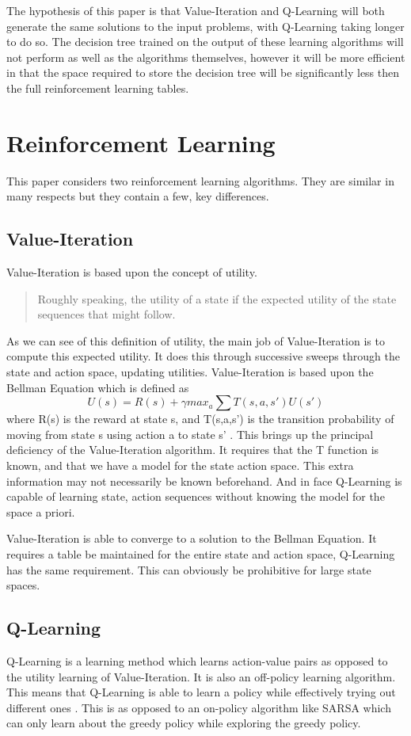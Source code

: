 \documentclass[12pt,letterpaper]{article}
\begin{document}
The hypothesis of this paper is that Value-Iteration and Q-Learning will both generate the same solutions to the input problems, with Q-Learning taking longer to do so. The decision tree trained on the output of these learning algorithms will not perform as well as the algorithms themselves, however it will be more efficient in that the space required to store the decision tree will be significantly less then the full reinforcement learning tables.  

\section{Reinforcement Learning}
This paper considers two reinforcement learning algorithms. They are similar in many respects but they contain a few, key differences. 

\subsection{Value-Iteration}
Value-Iteration is based upon the concept of utility. 
\begin{quote}
Roughly speaking, the utility of a state if the expected utility of the state sequences that might follow. 
\end{quote}
As we can see of this definition of utility, the main job of Value-Iteration is to compute this expected utility. It does this through successive sweeps through the state and action space, updating utilities. Value-Iteration is based upon the Bellman Equation which is defined as 
\[
U(s) = R(s)+\gamma max_{a} \sum T(s,a,s')U(s')
\]
where R(s) is the reward at state s, and T(s,a,s') is the transition probability of moving from state s using action a to state s' \cite{aima}. This brings up the principal deficiency of the Value-Iteration algorithm. It requires that the T function is known, and that we have a model for the state action space. This extra information may not necessarily be known beforehand. And in face Q-Learning is capable of learning state, action sequences without knowing the model for the space a priori. 

Value-Iteration is able to converge to a solution to the Bellman Equation. It requires a table be maintained for the entire state and action space, Q-Learning has the same requirement. This can obviously be prohibitive for large state spaces. 

\subsection{Q-Learning}
Q-Learning is a learning method which learns action-value pairs as opposed to the utility learning of Value-Iteration. It is also an off-policy learning algorithm. This means that Q-Learning is able to learn a policy while effectively trying out different ones \cite{riai}. This is as opposed to an on-policy algorithm like SARSA which can only learn about the greedy policy while exploring the greedy policy. 
\end{document}
